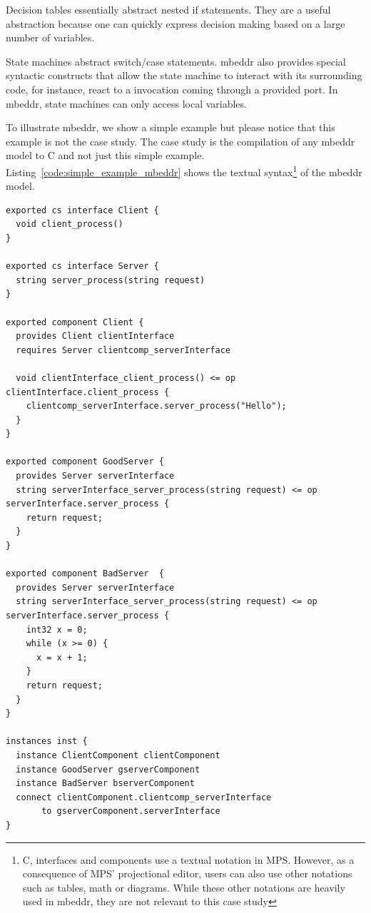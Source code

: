 Decision tables essentially abstract nested if statements. They are a useful abstraction because one can quickly express decision making based on a large number of variables. 

State machines abstract switch/case statements. mbeddr also provides special syntactic constructs that allow the state machine to interact with its surrounding code, for instance, react to a invocation coming through a provided port. In mbeddr, state machines can only access local variables.

To illustrate mbeddr, we show a simple example but please notice that this
example is not the case study.
The case study is the compilation of any mbeddr model to C and not just this
simple example.
Listing~\ref{code:simple_example_mbeddr} shows the textual
syntax\footnote{C, interfaces and components use a textual notation in MPS.
However, as a consequence of MPS' projectional editor, users can also use other
notations such as tables, math or diagrams. While these other notations are
heavily used in mbeddr, they are not relevant to this case study} of the mbeddr
model.


\begin{lstlisting}[float] 
exported cs interface Client { 
  void client_process() 
} 

exported cs interface Server { 
  string server_process(string request) 
} 

exported component Client { 
  provides Client clientInterface 
  requires Server clientcomp_serverInterface 
   
  void clientInterface_client_process() <= op clientInterface.client_process { 
    clientcomp_serverInterface.server_process("Hello"); 
  }  
}  

exported component GoodServer { 
  provides Server serverInterface 
  string serverInterface_server_process(string request) <= op serverInterface.server_process { 
    return request; 
  }  
}  

exported component BadServer  { 
  provides Server serverInterface 
  string serverInterface_server_process(string request) <= op serverInterface.server_process { 
    int32 x = 0; 
    while (x >= 0) { 
      x = x + 1; 
    } 
    return request; 
  } 
} 

instances inst { 
  instance ClientComponent clientComponent 
  instance GoodServer gserverComponent 
  instance BadServer bserverComponent 
  connect clientComponent.clientcomp_serverInterface 
       to gserverComponent.serverInterface
}
\end{lstlisting}

